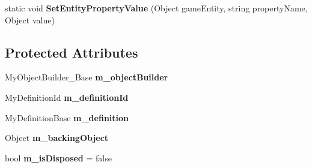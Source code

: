 \begin{DoxyCompactItemize}
\item 
\hypertarget{class_s_e_mod_a_p_i_internal_1_1_a_p_i_1_1_entity_1_1_base_object_aa5fb72609b65cd74ba06034539af7aef}{}static void {\bfseries Set\+Entity\+Property\+Value} (Object game\+Entity, string property\+Name, Object value)\label{class_s_e_mod_a_p_i_internal_1_1_a_p_i_1_1_entity_1_1_base_object_aa5fb72609b65cd74ba06034539af7aef}

\end{DoxyCompactItemize}
\subsection*{Protected Attributes}
\begin{DoxyCompactItemize}
\item 
\hypertarget{class_s_e_mod_a_p_i_internal_1_1_a_p_i_1_1_entity_1_1_base_object_a208abb851feda74e6bfb29d8ac393216}{}My\+Object\+Builder\+\_\+\+Base {\bfseries m\+\_\+object\+Builder}\label{class_s_e_mod_a_p_i_internal_1_1_a_p_i_1_1_entity_1_1_base_object_a208abb851feda74e6bfb29d8ac393216}

\item 
\hypertarget{class_s_e_mod_a_p_i_internal_1_1_a_p_i_1_1_entity_1_1_base_object_acb2257b74eea2c34b4f04edc4ccb7c73}{}My\+Definition\+Id {\bfseries m\+\_\+definition\+Id}\label{class_s_e_mod_a_p_i_internal_1_1_a_p_i_1_1_entity_1_1_base_object_acb2257b74eea2c34b4f04edc4ccb7c73}

\item 
\hypertarget{class_s_e_mod_a_p_i_internal_1_1_a_p_i_1_1_entity_1_1_base_object_af0728754014bb273188402657f57f2dd}{}My\+Definition\+Base {\bfseries m\+\_\+definition}\label{class_s_e_mod_a_p_i_internal_1_1_a_p_i_1_1_entity_1_1_base_object_af0728754014bb273188402657f57f2dd}

\item 
\hypertarget{class_s_e_mod_a_p_i_internal_1_1_a_p_i_1_1_entity_1_1_base_object_a8d298541c60a1391eeff043b7729f04e}{}Object {\bfseries m\+\_\+backing\+Object}\label{class_s_e_mod_a_p_i_internal_1_1_a_p_i_1_1_entity_1_1_base_object_a8d298541c60a1391eeff043b7729f04e}

\item 
\hypertarget{class_s_e_mod_a_p_i_internal_1_1_a_p_i_1_1_entity_1_1_base_object_adc5fa5cc4a43053b101bf56de27d76b6}{}bool {\bfseries m\+\_\+is\+Disposed} = false\label{class_s_e_mod_a_p_i_internal_1_1_a_p_i_1_1_entity_1_1_base_object_adc5fa5cc4a43053b101bf56de27d76b6}

\end{DoxyCompactItemize}
